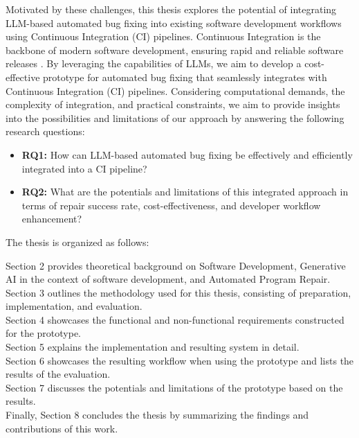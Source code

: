 Motivated by these challenges, this thesis explores the potential of integrating LLM-based automated bug fixing into existing software development workflows using Continuous Integration (CI) pipelines. Continuous Integration is the backbone of modern software development, ensuring rapid and reliable software releases \cite{ugwuezeContinuousIntegrationDeployment2024}. By leveraging the capabilities of LLMs, we aim to develop a cost-effective prototype for automated bug fixing that seamlessly integrates with Continuous Integration (CI) pipelines. Considering computational demands, the complexity of integration, and practical constraints, we aim to provide insights into the possibilities and limitations of our approach by answering the following research questions:

\begin{itemize}
\item \textbf{RQ1:} How can LLM-based automated bug fixing be effectively and efficiently integrated into a CI pipeline?
\item \textbf{RQ2:} What are the potentials and limitations of this integrated approach in terms of repair success rate, cost-effectiveness, and developer workflow enhancement?
\end{itemize}

The thesis is organized as follows:

Section 2 provides theoretical background on Software Development, Generative AI in the context of software development, and Automated Program Repair.\\
Section 3 outlines the methodology used for this thesis, consisting of preparation, implementation, and evaluation.\\
Section 4 showcases the functional and non-functional requirements constructed for the prototype.\\
Section 5 explains the implementation and resulting system in detail.\\
Section 6 showcases the resulting workflow when using the prototype and lists the results of the evaluation.\\
Section 7 discusses the potentials and limitations of the prototype based on the results.\\
Finally, Section 8 concludes the thesis by summarizing the findings and contributions of this work.
